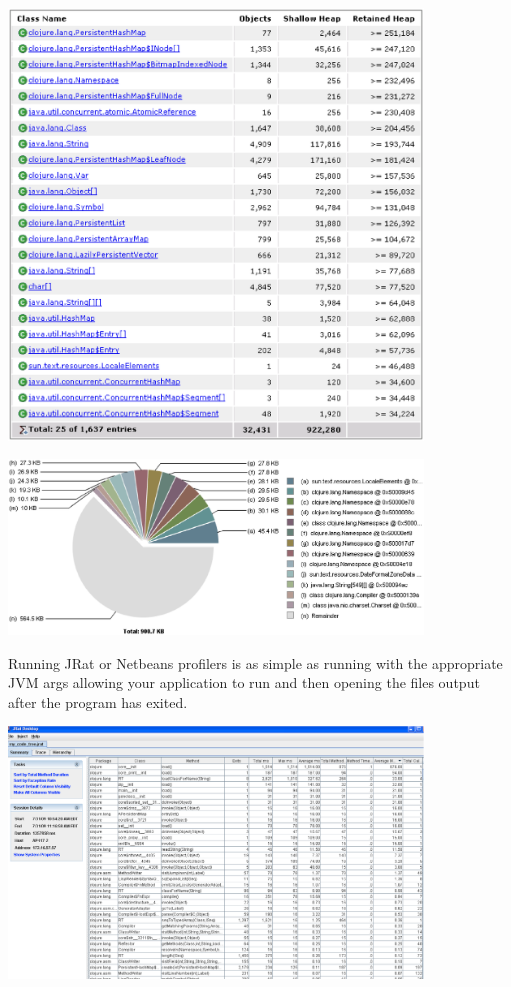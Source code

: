 \includegraphics[width=110mm]{mat_hist_31.eps}

\includegraphics[width=110mm]{map_big_32.eps}

Running JRat or Netbeans profilers is as simple as running with the appropriate JVM args allowing your application to run and then opening the files output after the program has exited.

\includegraphics[width=110mm]{jrat_output_38.eps}

